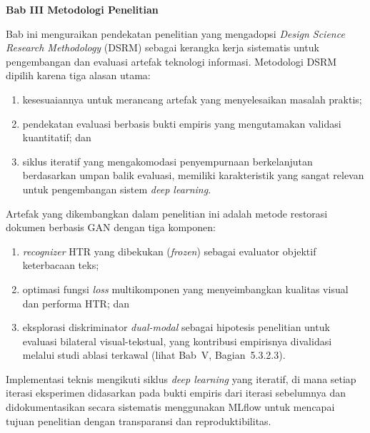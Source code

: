 \documentclass[12pt,a4paper]{article}
\begin{document}
\sloppy

\vspace{2cm}
\begin{center}
    {\fontsize{14}{16.8}\selectfont\textbf{Bab III \quad Metodologi Penelitian}}
\end{center}
\label{sec:metodologi}
\setcounter{section}{3}
\setcounter{subsection}{0}
\setcounter{table}{0}
\setcounter{figure}{0}
\vspace{0.8em}

Bab ini menguraikan pendekatan penelitian yang mengadopsi \textit{Design Science Research Methodology} (DSRM) sebagai kerangka kerja sistematis untuk pengembangan dan evaluasi artefak teknologi informasi. Metodologi DSRM dipilih karena tiga alasan utama:
\begin{enumerate}[label=(\arabic*), leftmargin=*, nosep]
    \item kesesuaiannya untuk merancang artefak yang menyelesaikan masalah praktis;
    \item pendekatan evaluasi berbasis bukti empiris yang mengutamakan validasi kuantitatif; dan
    \item siklus iteratif yang mengakomodasi penyempurnaan berkelanjutan berdasarkan umpan balik evaluasi, memiliki karakteristik yang sangat relevan untuk pengembangan sistem \textit{deep learning}.
\end{enumerate}
Artefak yang dikembangkan dalam penelitian ini adalah metode restorasi dokumen berbasis GAN dengan tiga komponen:
\begin{enumerate}[label=(\arabic*), leftmargin=*, nosep]
    \item \textit{recognizer} HTR yang dibekukan (\textit{frozen}) sebagai evaluator objektif keterbacaan teks;
    \item optimasi fungsi \textit{loss} multikomponen yang menyeimbangkan kualitas visual dan performa HTR; dan
    \item eksplorasi diskriminator \textit{dual-modal} sebagai hipotesis penelitian untuk evaluasi bilateral visual-tekstual, yang kontribusi empirisnya divalidasi melalui studi ablasi terkawal (lihat Bab~V, Bagian~5.3.2.3).
\end{enumerate}
Implementasi teknis mengikuti siklus \textit{deep learning} yang iteratif, di mana setiap iterasi eksperimen didasarkan pada bukti empiris dari iterasi sebelumnya dan didokumentasikan secara sistematis menggunakan MLflow untuk mencapai tujuan penelitian dengan transparansi dan reproduktibilitas.
\end{document}
